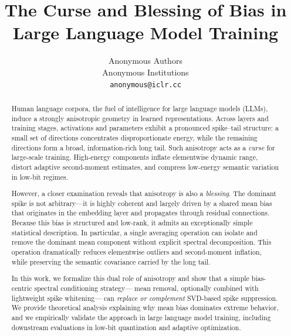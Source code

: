 \documentclass{article}
\title{The Curse and Blessing of Bias in Large Language Model Training}
\author{
  Anonymous Authors\\
  Anonymous Institutions\\
  \texttt{anonymous@iclr.cc}
}
\begin{document}
\maketitle

\begin{abstract}

Human language corpora, the fuel of intelligence for large language models (LLMs), induce a strongly anisotropic geometry in learned representations.
Across layers and training stages, activations and parameters exhibit a pronounced spike--tail structure:
a small set of directions concentrates disproportionate energy,
while the remaining directions form a broad, information-rich long tail.
Such anisotropy acts as a \emph{curse} for large-scale training.
High-energy components inflate elementwise dynamic range,
distort adaptive second-moment estimates,
and compress low-energy semantic variation in low-bit regimes.

However, a closer examination reveals that anisotropy is also a \emph{blessing}.
The dominant spike is not arbitrary—it is highly coherent and largely driven by a shared mean bias that originates in the embedding layer and propagates through residual connections.
Because this bias is structured and low-rank,
it admits an exceptionally simple statistical description.
In particular, a single averaging operation can isolate and remove the dominant mean component without explicit spectral decomposition.
This operation dramatically reduces elementwise outliers and second-moment inflation,
while preserving the semantic covariance carried by the long tail.

In this work, we formalize this dual role of anisotropy and show that
a simple bias-centric spectral conditioning strategy—
mean removal, optionally combined with lightweight spike whitening—
can \emph{replace or complement} SVD-based spike suppression.
We provide theoretical analysis explaining why mean bias dominates extreme behavior,
and we empirically validate the approach in large language model training,
including downstream evaluations in low-bit quantization and adaptive optimization.

\end{abstract}




% 

% 

% 

% 

% 

% 

\newpage





\newpage

\appendix
%
\end{document}
